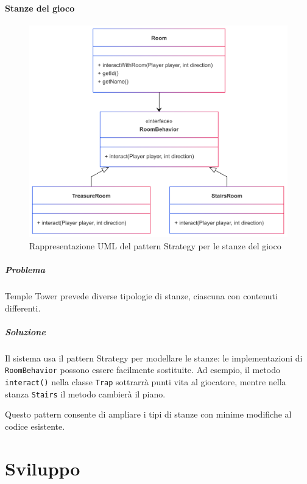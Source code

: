 \documentclass[a4paper,12pt]{report}
\begin{document}
\subsubsection{Stanze del gioco}

\begin{figure}[H]
\centering{}
\includegraphics[width=\textwidth]{img/behavior.png}
\caption{Rappresentazione UML del pattern Strategy per le stanze del gioco}
\label{img:rooms}
\end{figure}

\paragraph{Problema} Temple Tower prevede diverse tipologie di stanze, ciascuna con contenuti differenti.
  
\paragraph{Soluzione} Il sistema usa il pattern Strategy per modellare le stanze: le implementazioni di \texttt{RoomBehavior} possono essere facilmente sostituite. Ad esempio, il metodo \texttt{interact()} nella classe \texttt{Trap} sottrarrà punti vita al giocatore, mentre nella stanza \texttt{Stairs} il metodo cambierà il piano.
  
Questo pattern consente di ampliare i tipi di stanze con minime modifiche al codice esistente.

\chapter{Sviluppo}
\end{document}
